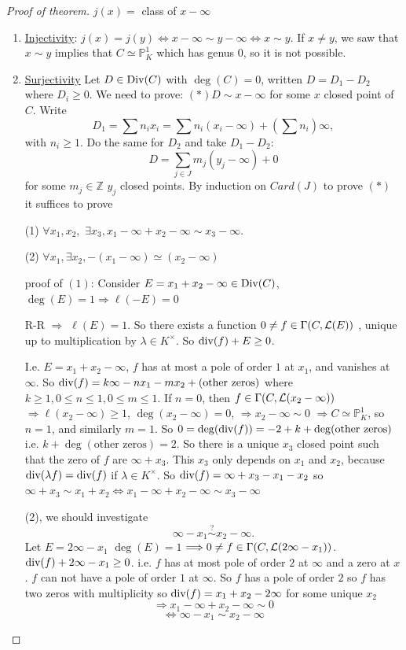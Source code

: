 \documentclass[11pt]{article}
\newcommand{\proj}{\mathbb P}
\newcommand{\intg}{\mathbb Z}
\newcommand{\call}{{\cal L}}
\renewcommand{\div}{\textnormal{div}}
\newcommand{\Div}{\textnormal{Div}}
\newcommand{\Lrta}{\Longrightarrow}
\newcommand{\Llrta}{\Longleftrightarrow}
\begin{document}
\begin{proof}[Proof of theorem]
$j(x)=$ class of $x-\infty$
\begin{enumerate}[label=(\arabic*)]
\item \underline{Injectivity}: $j(x)=j(y)\Llrta x-\infty\sim y-\infty\Llrta x\sim y$. If $x\neq y$, we saw that $x\sim y$ implies that $C\simeq \proj^1_K$ which has genus $0$, so it is not possible.
\item \underline{Surjectivity} Let $D\in \Div(C)$ with $\deg(C)=0$, written $D=D_1-D_2$ where $D_i\geq 0$. We need to prove: $(*)D\sim x-\infty$ for some $x$ closed point of $C$. Write 
$$
D_1=\sum n_i x_i=\sum n_i(x_i-\infty)+(\sum n_i)\infty,
$$
with $n_i\geq 1$.
Do  the same for $D_2$ and take $D_1-D_2:$
$$
D=\sum_{j\in J} m_j(y_j-\infty)+0
$$
for some $m_j\in \intg$ $y_j$ closed points. By induction on $Card(J)$ to prove $(*)$ it suffices to prove

(1) $\forall x_1,x_2,$ $\exists x_3, x_1-\infty+x_2-\infty\sim x_3-\infty$.

(2) $\forall x_1,\exists x_2, -(x_1-\infty)\simeq (x_2-\infty)$

proof of $(1)$: Consider $E=x_1+x_2-\infty\in \Div(C)$, $\deg(E)=1\Lrta \ell(-E)=0$

R-R $\Lrta$ $\ell(E)=1$. So there exists a function $0\neq f \in \Gamma(C,\call(E))$
, unique up to multiplication by $\lambda\in K^\times$. So $\div(f)+ E\geq 0$.

I.e. $E=x_1+x_2-\infty$, $f$ has at most a pole of order $1$ at $x_1$,  and vanishes at $\infty$. So $\div(f)=k\infty -n x_1-m x_2+(\text{other zeros})$ where $k\geq 1, 0\leq n\leq 1, 0\leq m\leq 1$. If $n=0$, then $f\in \Gamma(C,\call(x_2-\infty))$  
$\Lrta \ell(x_2-\infty)\geq 1$,
 $\deg(x_2-\infty)=0$, $\Lrta x_2-\infty\sim 0$ $\Lrta C\simeq \proj^1_K$, so $n=1$, and similarly $m=1$. So $0=\deg(\div(f))=-2+k+\deg(\text{other zeros})$ i.e. $k+\deg(\text{other zeros})=2$. So there is a unique $x_3$ closed point such that the zero of $f$ are $\infty +x_3$. This $x_3$ only depends on $x_1$ and  $x_2$, because $\div(\lambda f)= \div(f)$ if $\lambda \in K^\times$. So 
 $\div(f)=\infty+x_3-x_1-x_2$ so $\infty +x_3\sim x_1+x_2\Llrta x_1-\infty +x_2-\infty\sim x_3-\infty$

 (2),  we should investigate 
 $$
\infty -x_1\overset{?}{\sim} x_2-\infty.
 $$
 Let $E=2\infty -x_1$ $\deg(E)=1$ $\Lrta 0\neq f \in \Gamma(C,\call(2\infty-x_1))$. $\div(f)+2\infty -x_1\geq 0$. i.e. $f$ has at most pole of order $2$ at $\infty$ and a zero at $x$. $f$ can not have a pole of order $1$ at $\infty$. So $f$ has a pole of order $2$ so $f$ has two zeros with multiplicity so $\div(f)=x_1+x_2-2\infty$ for some unique $x_2$
 $$
\Lrta x_1-\infty +x_2-\infty\sim 0
 $$
 $$
\Llrta \infty -x_1\sim x_2-\infty
 $$
\end{enumerate}
\end{proof}
\end{document}
